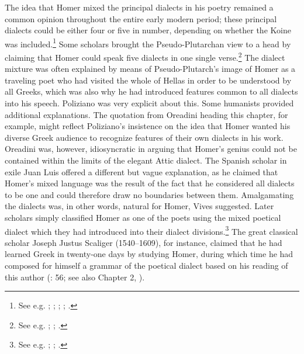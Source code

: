 The idea that Homer mixed the principal dialects in his poetry remained a common opinion throughout the entire early modern period; these principal dialects could be either four or five in number, depending on whether the Koine was included.\footnote{See e.g. \citet[\textsc{aa.}i\textsc{\textsuperscript{r}}]{Simler1512}; \citet[\textsc{a}.viii\textsc{\textsuperscript{r}}]{Liburnio1546}; \citet[xxxiv]{Lancelot1655}; \citet[20--23]{Grosch1753}; \citet[196]{Ries1786}.} Some scholars brought the Pseudo-Plutarchan view to a head by claiming that Homer could speak five dialects in one single verse.\footnote{See e.g. \citet[\textit{s.u. dialecte}]{Furetiere1701}; \citet[\textsc{i.}203, 3rd sequence of pagination]{Chambers1728}; \citet[934]{Dumarsais1754}.} The dialect mixture was often explained by means of Pseudo-Plutarch’s image of Homer as a traveling poet who had visited the whole of Hellas in order to be understood by all Greeks, which was also why he had introduced features common to all dialects into his speech. Poliziano was very explicit about this. Some humanists provided additional explanations. The quotation from Oreadini heading this chapter, for example, might reflect Poliziano’s insistence on the idea that Homer wanted his diverse Greek audience to recognize features of their own dialects in his work. Oreadini was, however, idiosyncratic in arguing that Homer’s genius could not be contained within the limits of the elegant Attic dialect. The Spanish scholar in exile Juan Luis \citet[\textsc{x}.iiii\textsc{\textsuperscript{r}}]{Vives1533} offered a different but vague explanation, as he claimed that Homer’s mixed language was the result of the fact that he considered all dialects to be one and could therefore draw no boundaries between them. Amalgamating the dialects was, in other words, natural for Homer, Vives suggested. Later scholars simply classified Homer as one of the poets using the mixed poetical dialect which they had introduced into their dialect divisions.\footnote{See e.g. \citet[6\textsc{\textsuperscript{r-v}}]{Baile1588}; \citet[333]{Alsted1630}; \citet[161]{Gesner1774}.} The great classical scholar Joseph Justus Scaliger (1540–1609), for instance, claimed that he had learned Greek in twenty-one days by studying Homer, during which time he had composed for himself a grammar of the poetical dialect based on his reading of this author (\citealt{Scaliger1594}: 56; see also Chapter 2, ).


